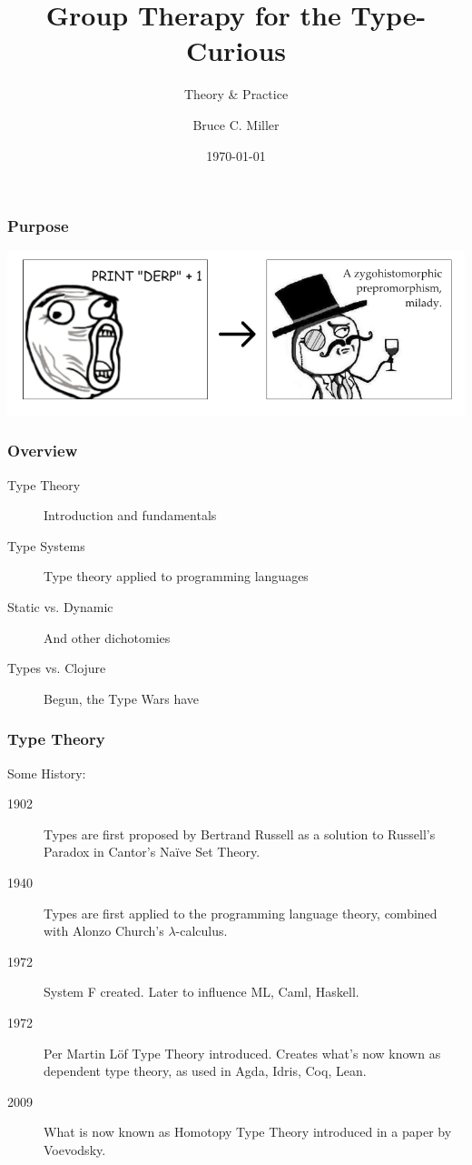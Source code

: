 \documentclass{beamer}
\title{Group Therapy for the Type-Curious}
\subtitle{Theory \& Practice}
\author{Bruce C. Miller}
\institute{bm3719@gmail.com}
\date{\today}
\begin{document}
\begin{frame}
\titlepage
\end{frame}

\begin{frame}
  \frametitle{Purpose}
  \centerline{\includegraphics[scale=0.4]{img/transformation.png}}
\end{frame}

\begin{frame}
\frametitle{Overview}
\begin{description}
\item[Type Theory] Introduction and fundamentals
\item[Type Systems] Type theory applied to programming languages
\item[Static vs. Dynamic] And other dichotomies
\item[Types vs. Clojure] Begun, the Type Wars have
\end{description}
\end{frame}

\begin{frame}
  \frametitle{Type Theory}
  Some History:
\begin{description}
\item[1902] Types are first proposed by Bertrand Russell as a solution to
  Russell's Paradox in Cantor's Na{\"i}ve Set Theory.
\item[1940] Types are first applied to the programming language theory,
  combined with Alonzo Church's $\lambda$-calculus.
\item[1972] System F created.  Later to influence ML, Caml, Haskell.
\item[1972] Per Martin L{\"o}f Type Theory introduced.  Creates what's now
  known as dependent type theory, as used in Agda, Idris, Coq, Lean.
\item[2009] What is now known as Homotopy Type Theory introduced in a paper by
  Voevodsky.
\end{description}
\end{frame}
\end{document}
